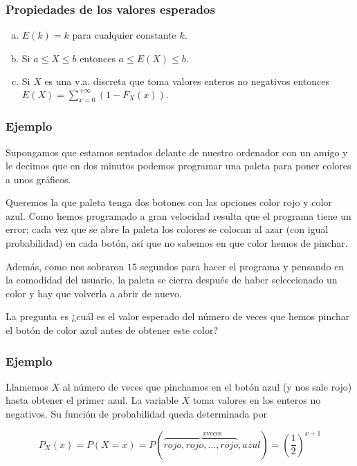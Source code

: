 \documentclass[handout]{beamer}\usepackage[]{graphicx}\usepackage[]{color}
\renewcommand{\leq}{\leqslant}
\theoremstyle{plain}
\theoremstyle{definition}
\begin{document}
\begin{frame}
\frametitle{Propiedades de los valores esperados}

\begin{enumerate}[a)]
\item $E(k)=k$ para cualquier constante $k$.
\item Si $a\leq X\leq b$ entonces $a\leq E(X)\leq b$.
\item Si $X$ es una v.a. discreta que toma valores enteros no negativos entonces
$E(X)=\sum_{x=0}^{+\infty}(1- F_X(x)).$
\end{enumerate}

\end{frame}



\begin{frame}
\frametitle{Ejemplo}
Supongamos que estamos sentados delante de nuestro ordenador con un amigo y
le decimos que en dos minutos podemos programar una paleta  para poner colores a unos
gráficos. 

Queremos la que paleta tenga dos botones con las opciones color rojo y color azul.
Como hemos programado a gran velocidad resulta que el programa tiene un error; cada vez que
se abre la paleta los colores se colocan al azar (con igual probabilidad) en cada botón,
así que no sabemos en que color hemos de pinchar. 

Además, como nos sobraron $15$ segundos
para hacer el programa y pensando en la  comodidad del usuario, la paleta se cierra después de haber seleccionado  un
color y hay que volverla a abrir de nuevo.

La pregunta es ¿cuál es el valor esperado del
número de veces que hemos pinchar el botón de color azul antes de obtener este color?
\end{frame}


\begin{frame}
\frametitle{Ejemplo}

Llamemos $X$ al número de veces que pinchamos en el botón azul (y nos sale rojo) hasta
obtener el primer azul. La variable $X$ toma valores en los enteros no negativos. Su
función de probabilidad queda determinada por

$$P_X(x)=P(X=x)=P(\stackrel{x \mbox{veces}}{\overbrace{rojo, rojo,\ldots,rojo},azul})
=\left(\frac{1}{2}\right)^{x+1}$$
\end{frame}
\end{document}
